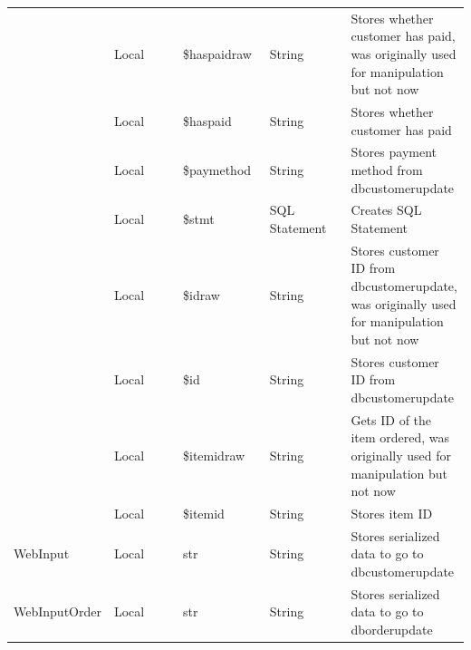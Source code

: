 \documentclass[11pt]{report}
\begin{document}
\begin{longtable}{|p{0.2\linewidth}|p{0.2\linewidth}|p{0.2\linewidth}|p{0.2\linewidth}|p{0.2\linewidth}|}
			 & Local & \$haspaidraw & String & Stores whether customer has paid, was originally used for manipulation but not now \\
			 & Local & \$haspaid & String & Stores whether customer has paid \\
			 & Local & \$paymethod & String & Stores payment method from dbcustomerupdate \\
			 & Local & \$stmt & SQL Statement & Creates SQL Statement \\
			 & Local & \$idraw & String & Stores customer ID from dbcustomerupdate, was originally used for manipulation but not now \\
			 & Local & \$id & String & Stores customer ID from dbcustomerupdate \\
			 & Local & \$itemidraw & String & Gets ID of the item ordered, was originally used for manipulation but not now \\
			 & Local & \$itemid & String & Stores item ID \\
			 \hline
			WebInput & Local & str & String & Stores serialized data to go to dbcustomerupdate \\
			\hline
			WebInputOrder & Local & str & String & Stores serialized data to go to dborderupdate \\
	\end{longtable}
\restoregeometry
\end{document}
